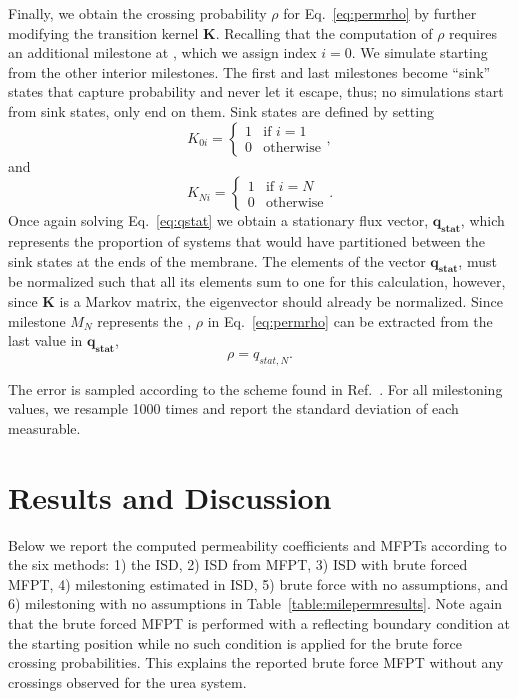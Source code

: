         \par Finally, we obtain the crossing probability $\rho$ for Eq.~\ref{eq:permrho} by further modifying the transition kernel $\mathbf{K}$. Recalling that the computation of $\rho$ requires an additional milestone at , which we assign index $i = 0$. We simulate starting from the other interior milestones. The first and last milestones become ``sink'' states that capture probability and never let it escape, thus; no simulations start from sink states, only end on them. Sink states are defined by setting
        \begin{equation}
            K_{0i} = \begin{cases}
                1 & \text{if } i = 1\\
                0 & \text{otherwise}
            \end{cases},
        \end{equation}
        and
        \begin{equation}
            K_{Ni} = \begin{cases}
                1 & \text{if } i = N\\
                0 & \text{otherwise}
            \end{cases}.
        \end{equation}
        Once again solving Eq.~\ref{eq:qstat} we obtain a stationary flux vector, $\mathbf{q_{stat}}$, which represents the proportion of systems that would have partitioned between the sink states at the ends of the membrane. The elements of the vector $\mathbf{q_{stat}}$, must be normalized such that all its elements sum to one for this calculation, however, since $\mathbf{K}$ is a Markov matrix, the eigenvector should already be normalized. Since milestone $M_N$ represents the , $\rho$ in Eq.~\ref{eq:permrho} can be extracted from the last value in $\mathbf{q_{stat}}$,
        \begin{equation}
            \rho = q_{stat,N}.
        \end{equation}

        \par The error is sampled according to the scheme found in Ref.~. For all milestoning values, we resample 1000 times and report the standard deviation of each measurable.

\section{Results and Discussion}
    \par Below we report the computed permeability coefficients and MFPTs according to the six methods: 1) the ISD, 2) ISD from MFPT, 3) ISD with brute forced MFPT, 4) milestoning estimated \mfpt in ISD, 5) brute force with no assumptions, and 6) milestoning with no assumptions in Table~\ref{table:milepermresults}. Note again that the brute forced MFPT is performed with a reflecting boundary condition at the starting position while no such condition is applied for the brute force crossing probabilities. This explains the reported brute force MFPT without any crossings observed for the urea system.


